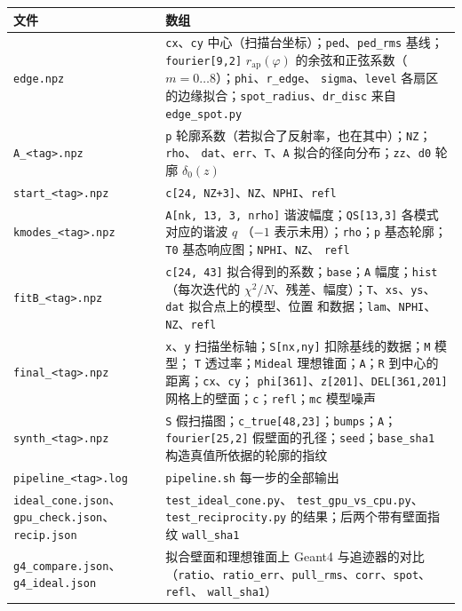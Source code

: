 \documentclass[11pt,a4paper,fontset=fandol]{ctexart}
\newcommand{\code}[1]{\texttt{#1}}
\begin{document}
\begin{tabularx}{\textwidth}{@{}L{3.5cm}Y@{}}
\toprule
文件 & 数组 \\
\midrule
\code{edge.npz} & \code{cx}、\code{cy} 中心（扫描台坐标）；\code{ped}、\code{ped\_rms} 基线；
\code{fourier[9,2]} $r_\mathrm{ap}(\varphi)$ 的余弦和正弦系数（$m=0\ldots8$）；\code{phi}、\code{r\_edge}、
\code{sigma}、\code{level} 各扇区的边缘拟合；\code{spot\_radius}、\code{dr\_disc} 来自
\code{edge\_spot.py} \\
\code{A\_<tag>.npz} & \code{p} 轮廓系数（若拟合了反射率，也在其中）；\code{NZ}；\code{rho}、
\code{dat}、\code{err}、\code{T}、\code{A} 拟合的径向分布；\code{zz}、\code{d0} 轮廓 $\delta_0(z)$ \\
\code{start\_<tag>.npz} & \code{c[24, NZ+3]}、\code{NZ}、\code{NPHI}、\code{refl} \\
\code{kmodes\_<tag>.npz} & \code{A[nk, 13, 3, nrho]} 谐波幅度；\code{QS[13,3]} 各模式对应的谐波 $q$
（$-1$ 表示未用）；\code{rho}；\code{p} 基态轮廓；\code{T0} 基态响应图；\code{NPHI}、\code{NZ}、
\code{refl} \\
\code{fitB\_<tag>.npz} & \code{c[24, 43]} 拟合得到的系数；\code{base}；\code{A} 幅度；\code{hist}
（每次迭代的 $\chi^2/N$、残差、幅度）；\code{T}、\code{xs}、\code{ys}、\code{dat} 拟合点上的模型、位置
和数据；\code{lam}、\code{NPHI}、\code{NZ}、\code{refl} \\
\code{final\_<tag>.npz} & \code{x}、\code{y} 扫描坐标轴；\code{S[nx,ny]} 扣除基线的数据；\code{M} 模型；
\code{T} 透过率；\code{Mideal} 理想锥面；\code{A}；\code{R} 到中心的距离；\code{cx}、\code{cy}；
\code{phi[361]}、\code{z[201]}、\code{DEL[361,201]} 网格上的壁面；\code{c}；\code{refl}；\code{mc}
模型噪声 \\
\code{synth\_<tag>.npz} & \code{S} 假扫描图；\code{c\_true[48,23]}；\code{bumps}；\code{A}；
\code{fourier[25,2]} 假壁面的孔径；\code{seed}；\code{base\_sha1} 构造真值所依据的轮廓的指纹 \\
{\small\code{pipeline\_<tag>.log}} & \code{pipeline.sh} 每一步的全部输出 \\
\code{ideal\_cone.json}、\code{gpu\_check.json}、\code{recip.json} & \code{test\_ideal\_cone.py}、
\code{test\_gpu\_vs\_cpu.py}、\code{test\_reciprocity.py} 的结果；后两个带有壁面指纹 \code{wall\_sha1} \\
\code{g4\_compare.json}、\code{g4\_ideal.json} & 拟合壁面和理想锥面上 Geant4 与追迹器的对比
（\code{ratio}、\code{ratio\_err}、\code{pull\_rms}、\code{corr}、\code{spot}、\code{refl}、
\code{wall\_sha1}） \\

\end{tabularx}
\end{document}
